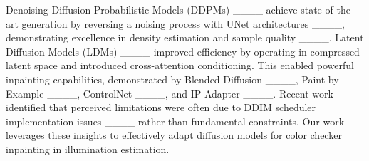 \vspace{3pt}  
% 
Denoising Diffusion Probabilistic Models (DDPMs) ____ achieve state-of-the-art generation by reversing a noising process with UNet architectures ____, demonstrating excellence in density estimation and sample quality ____.
Latent Diffusion Models (LDMs) ____ improved efficiency by operating in compressed latent space and introduced cross-attention conditioning. This enabled powerful inpainting capabilities, demonstrated by Blended Diffusion ____, Paint-by-Example ____, ControlNet ____, and IP-Adapter ____.
Recent work identified that perceived limitations were often due to DDIM scheduler implementation issues ____ rather than fundamental constraints. Our work leverages these insights to effectively adapt diffusion models for color checker inpainting in illumination estimation.

